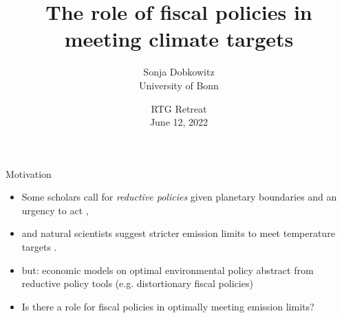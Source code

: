\documentclass[11pt,aspectratio=169]{beamer}
\author[Sonja Dobkowitz]{\small Sonja Dobkowitz\\ \footnotesize{University of Bonn%
	}\\ }
\title{The role of fiscal policies in meeting climate targets}
\date{\small{RTG Retreat\\ June 12, 2022 }}
\begin{document}
	
	{
		\begin{frame}
		\titlepage
	\end{frame}
}



\addtocounter{framenumber}{-1}
\begin{frame}{Motivation}

\begin{itemize}[<+-| alert@+>]
	\item Some scholars call for \textit{reductive policies} given planetary boundaries and an urgency to act  \citep{Schor2005SustainableReduction, Arrow2004AreMuch, Dasgupta2021},
	\vspace{3mm}
	\item and natural scientists suggest stricter emission limits to meet temperature targets  \citep[e.g. IPPC reports ][]{Rogelj2018MitigationDevelopment., IPCC2022}.
	\vspace{3mm}
	\item but: economic models on optimal environmental policy abstract from reductive policy tools (e.g. distortionary fiscal policies)%
	\vspace{3mm}
\item Is there a role for fiscal policies in optimally meeting emission limits?
\end{itemize}
\end{frame}
\end{document}
